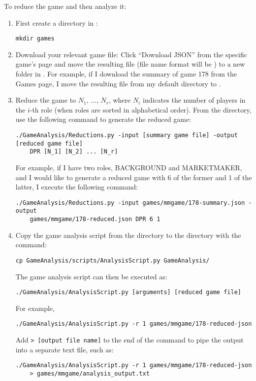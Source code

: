 \documentclass[11pt]{article}
\begin{document}
To reduce the game and then analyze it:
\begin{enumerate}
\item First create a directory  in :
\begin{verbatim}
mkdir games
\end{verbatim}
\item Download your relevant game file: Click ``Download JSON'' from the specific game's page and move the resulting file (file name format will be ) to a new folder in . For example, if I download the summary of game 178 from the Games page, I move the resulting  file from my default  directory to . 
\item Reduce the game to $N_1$, ..., $N_r$, where $N_i$ indicates the number of players in the $i$-th role (when roles are sorted in alphabetical order). From the  directory, use the following command to generate the reduced game:
\begin{verbatim}
./GameAnalysis/Reductions.py -input [summary game file] -output [reduced game file] 
    DPR [N_1] [N_2] ... [N_r]
\end{verbatim}
For example, if I have two roles, BACKGROUND and MARKETMAKER, and I would like to generate a reduced game with 6 of the former and 1 of the latter, I execute the following command:
\begin{verbatim}
./GameAnalysis/Reductions.py -input games/mmgame/178-summary.json -output 
    games/mmgame/178-reduced.json DPR 6 1
\end{verbatim}

\item Copy the game analysis script from the  directory to the  directory with the command:
\begin{verbatim}
cp GameAnalysis/scripts/AnalysisScript.py GameAnalysis/
\end{verbatim}
The game analysis script can then be executed as:
\begin{verbatim}
./GameAnalysis/AnalysisScript.py [arguments] [reduced game file]
\end{verbatim}
For example,
\begin{verbatim}
./GameAnalysis/AnalysisScript.py -r 1 games/mmgame/178-reduced-json
\end{verbatim}
Add \verb|> [output file name]| to the end of the command to pipe the output into a separate text file, such as:
\begin{verbatim}
./GameAnalysis/AnalysisScript.py -r 1 games/mmgame/178-reduced-json
    > games/mmgame/analysis_output.txt
\end{verbatim}
\end{enumerate}
\end{document}
